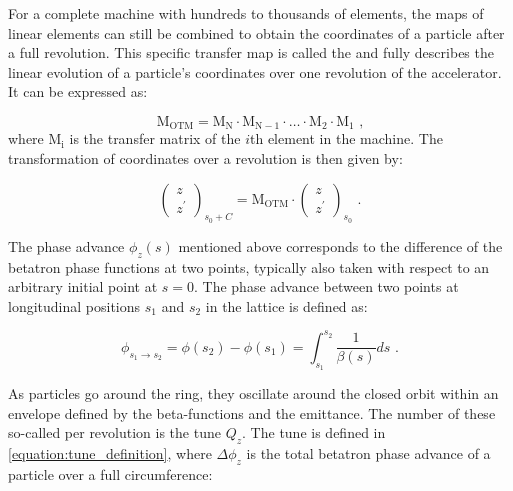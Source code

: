 For a complete machine with hundreds to thousands of elements, the maps of linear elements can still be combined to obtain the coordinates of a particle after a full revolution.
This specific transfer map is called the  and fully describes the linear evolution of a particle's coordinates over one revolution of the accelerator.
It can be expressed as:

\begin{equation}
    \mathrm{M_{OTM}} = \mathrm{M_N} \cdot \mathrm{M_{N-1}} \cdot \ldots \cdot \mathrm{M_2} \cdot \mathrm{M_1} \text{ ,}
    \label{equation:one_turn_map}
\end{equation}
where \(\mathrm{M_i}\) is the transfer matrix of the \(i\)th element in the machine.
The transformation of coordinates over a revolution is then given by:

\begin{equation}
    \begin{pmatrix}
        z \\
        z^{\prime}
    \end{pmatrix}_{s_0 + C} = \mathrm{M_{OTM}} \cdot \begin{pmatrix}
        z \\
        z^{\prime}
    \end{pmatrix}_{s_0} \text{ .}
    \label{equation:one_turn_coordinates_transformation}
\end{equation}

The phase advance \(\phi_z(s)\) mentioned above corresponds to the difference of the betatron phase functions at two points, typically also taken with respect to an arbitrary initial point at \(s = 0\).
The phase advance between two points at longitudinal positions \(s_1\) and \(s_2\) in the lattice is defined as:

\begin{equation}
    \phi_{s_1 \rightarrow s_2} = \phi(s_{2}) - \phi(s_{1}) = \int_{s_{1}}^{s_{2}} \frac{1}{\beta(s)} ds \text{ .}
    \label{equation:phase_advance_definition}
\end{equation}

As particles go around the ring, they oscillate around the closed orbit within an envelope defined by the \glspl{beta-function} and the emittance.
The number of these so-called  per revolution is the \gls{tune} \(Q_z\).
The tune is defined in \cref{equation:tune_definition}, where \(\Delta \phi_{z}\) is the total betatron phase advance of a particle over a full circumference:

